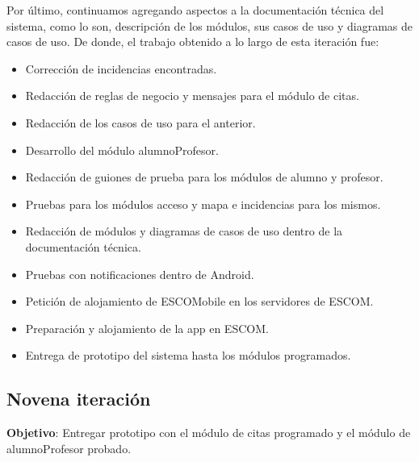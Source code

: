 \newline
\newline
Por último, continuamos agregando aspectos a la documentación técnica del sistema, como lo son, descripción de los módulos, sus casos de uso y diagramas de casos de uso.
\newline
De donde, el trabajo obtenido a lo largo de esta iteración fue:
\begin{itemize}
	\item Corrección de incidencias encontradas.
	\item Redacción de reglas de negocio y mensajes para el módulo de citas.
	\item Redacción de los casos de uso para el anterior.
	\item Desarrollo del módulo alumnoProfesor.
	\item Redacción de guiones de prueba para los módulos de alumno y profesor.
	\item Pruebas para los módulos acceso y mapa e incidencias para los mismos.
	\item Redacción de módulos y diagramas de casos de uso dentro de la documentación técnica.
	\item Pruebas con notificaciones dentro de Android.
	\item Petición de alojamiento de ESCOMobile en los servidores de ESCOM.
	\item Preparación y alojamiento de la app en ESCOM.
	\item Entrega de prototipo del sistema hasta los módulos programados.
\end{itemize}


\subsection{Novena iteración} 

\noindent
\textbf{Objetivo}: Entregar prototipo con el módulo de citas programado y el módulo de alumnoProfesor probado.
\newline

